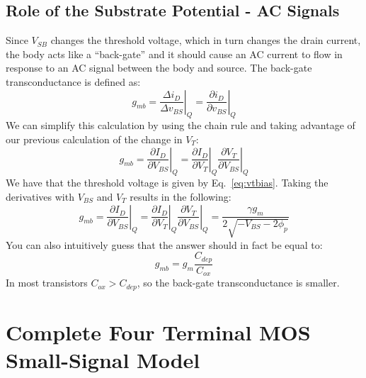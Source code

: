 \subsection{Role of the Substrate Potential - AC Signals}
Since $V_{SB}$ changes the threshold voltage, which in turn changes the drain current, the body acts like a ``back-gate” and it should cause an AC current to flow in response to an AC signal between the body and source.  The back-gate transconductance is defined as:
    \begin{equation} 
        {g_{mb}} = {\left. {\frac{{\Delta {i_D}}}{{\Delta {v_{BS}}}}} \right|_Q} = {\left. {\frac{{\partial {i_D}}}{{\partial {v_{BS}}}}} \right|_Q} 
    \end{equation}
We can simplify this calculation by using the chain rule and taking advantage of our previous calculation of the change in $V_T$:
    \begin{equation}
        {g_{mb}} = {\left. {\frac{{\partial {I_D}}}{{\partial {V_{BS}}}}} \right|_Q} = {\left. {\frac{{\partial {I_D}}}{{\partial {V_{T}}}}} \right|_Q}{\left. {\frac{{\partial {V_{T}}}}{{\partial {V_{BS}}}}} \right|_Q}
    \end{equation}
We have that the threshold voltage is given by Eq.~\ref{eq:vtbias}.  Taking the derivatives with $V_{BS}$ and $V_T$ results in the following:
    \begin{equation}
        {g_{mb}} = {\left. {\frac{{\partial {I_D}}}{{\partial {V_{BS}}}}} \right|_Q} = {\left. {\frac{{\partial {I_D}}}{{\partial {V_{T}}}}} \right|_Q}{\left. {\frac{{\partial {V_{T}}}}{{\partial {V_{BS}}}}} \right|_Q} = \frac{{\gamma {g_m}}}{{2\sqrt { - {V_{BS}} - 2{\phi _p}} }}
    \end{equation}
You can also intuitively guess that the answer should in fact be equal to:
    \begin{equation}
        g_{mb} = g_m \frac{C_{dep}}{C_{ox}}
    \end{equation}
In most transistors $C_{ox} > C_{dep}$, so the back-gate transconductance is smaller.   
\section{Complete Four Terminal MOS Small-Signal Model}
